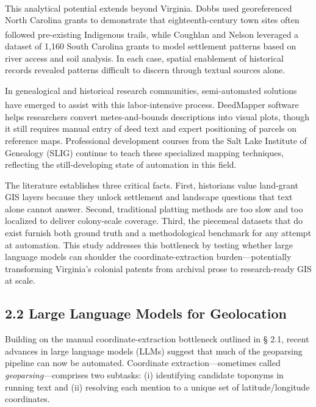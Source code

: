 \documentclass[
  10pt,
  twocolumn]{article}
\begin{document}
This analytical potential extends beyond Virginia.
Dobbs\textsuperscript{} used
georeferenced North Carolina grants to demonstrate that
eighteenth-century town sites often followed pre-existing Indigenous
trails, while Coughlan and
Nelson\textsuperscript{}
leveraged a dataset of 1,160 South Carolina grants to model settlement
patterns based on river access and soil analysis. In each case, spatial
enablement of historical records revealed patterns difficult to discern
through textual sources alone.

In genealogical and historical research communities, semi-automated
solutions have emerged to assist with this labor-intensive process.
DeedMapper
software\textsuperscript{} helps
researchers convert metes-and-bounds descriptions into visual plots,
though it still requires manual entry of deed text and expert
positioning of parcels on reference maps. Professional development
courses from the Salt Lake Institute of Genealogy (SLIG) continue to
teach these specialized mapping techniques, reflecting the
still-developing state of automation in this field.

The literature establishes three critical facts. First, historians value
land-grant GIS layers because they unlock settlement and landscape
questions that text alone cannot answer. Second, traditional platting
methods are too slow and too localized to deliver colony-scale coverage.
Third, the piecemeal datasets that do exist furnish both ground truth
and a methodological benchmark for any attempt at automation. This study
addresses this bottleneck by testing whether large language models can
shoulder the coordinate-extraction burden---potentially transforming
Virginia's colonial patents from archival prose to research-ready GIS at
scale.

\subsection{2.2 Large Language Models for
Geolocation}\label{large-language-models-for-geolocation}

Building on the manual coordinate-extraction bottleneck outlined in §
2.1, recent advances in large language models (LLMs) suggest that much
of the geoparsing pipeline can now be automated. Coordinate
extraction---sometimes called \emph{geoparsing}---comprises two
subtasks: (i) identifying candidate toponyms in running text and (ii)
resolving each mention to a unique set of latitude/longitude
coordinates.
\end{document}
